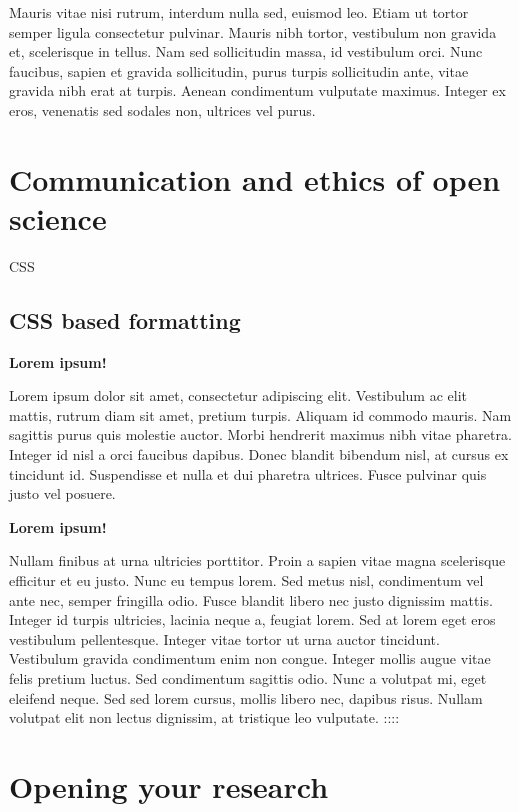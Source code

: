 \documentclass[
]{book}
\begin{document}
Mauris vitae nisi rutrum, interdum nulla sed, euismod leo. Etiam ut tortor semper ligula consectetur pulvinar. Mauris nibh tortor, vestibulum non gravida et, scelerisque in tellus. Nam sed sollicitudin massa, id vestibulum orci. Nunc faucibus, sapien et gravida sollicitudin, purus turpis sollicitudin ante, vitae gravida nibh erat at turpis. Aenean condimentum vulputate maximus. Integer ex eros, venenatis sed sodales non, ultrices vel purus.

\hypertarget{communication-and-ethics-of-open-science}{%
\chapter{Communication and ethics of open science}\label{communication-and-ethics-of-open-science}}

CSS

\hypertarget{css-based-formatting}{%
\section{CSS based formatting}\label{css-based-formatting}}

\textbf{Lorem ipsum!}

Lorem ipsum dolor sit amet, consectetur adipiscing elit. Vestibulum ac elit mattis, rutrum diam sit amet, pretium turpis. Aliquam id commodo mauris. Nam sagittis purus quis molestie auctor. Morbi hendrerit maximus nibh vitae pharetra. Integer id nisl a orci faucibus dapibus. Donec blandit bibendum nisl, at cursus ex tincidunt id. Suspendisse et nulla et dui pharetra ultrices. Fusce pulvinar quis justo vel posuere.

\textbf{Lorem ipsum!}

Nullam finibus at urna ultricies porttitor. Proin a sapien vitae magna scelerisque efficitur et eu justo. Nunc eu tempus lorem. Sed metus nisl, condimentum vel ante nec, semper fringilla odio. Fusce blandit libero nec justo dignissim mattis. Integer id turpis ultricies, lacinia neque a, feugiat lorem. Sed at lorem eget eros vestibulum pellentesque. Integer vitae tortor ut urna auctor tincidunt. Vestibulum gravida condimentum enim non congue. Integer mollis augue vitae felis pretium luctus. Sed condimentum sagittis odio. Nunc a volutpat mi, eget eleifend neque. Sed sed lorem cursus, mollis libero nec, dapibus risus. Nullam volutpat elit non lectus dignissim, at tristique leo vulputate.
::::

\hypertarget{opening-your-research}{%
\chapter{Opening your research}\label{opening-your-research}}
\end{document}
